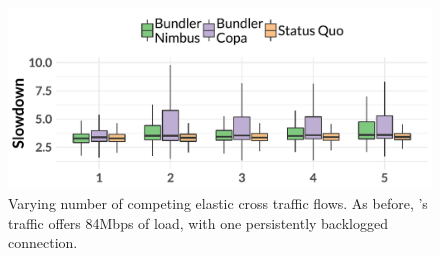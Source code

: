 \begin{figure}
    \centering
\begin{knitrout}
\color{fgcolor}
\includegraphics[width=\maxwidth]{figure/robust:cr-elastic-1} 

\end{knitrout}
    \caption{Varying number of competing elastic cross traffic flows. As before, \name's traffic offers 84Mbps of load, with one persistently backlogged connection.}
    \label{fig:robust:cr-elastic}
\end{figure}
